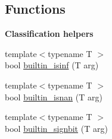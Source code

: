 \subsection*{Functions}
\begin{Indent}\textbf{ Classification helpers}\par
\begin{DoxyCompactItemize}
\item 
{\footnotesize template$<$typename T $>$ }\\bool \hyperlink{namespacehalf__float_1_1detail_aeb1b5890af847586d019111c931e7f3b}{builtin\+\_\+isinf} (T arg)
\item 
{\footnotesize template$<$typename T $>$ }\\bool \hyperlink{namespacehalf__float_1_1detail_a20cedf19efac6e017090e17ea38342cf}{builtin\+\_\+isnan} (T arg)
\item 
{\footnotesize template$<$typename T $>$ }\\bool \hyperlink{namespacehalf__float_1_1detail_a0f1b0ddcef962521b4c76f661659e5a7}{builtin\+\_\+signbit} (T arg)
\end{DoxyCompactItemize}
\end{Indent}
